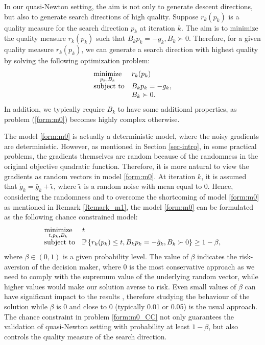 \documentclass[11pt,twoside]{article}
\begin{document}
In our quasi-Newton setting, the aim is not only to generate descent
directions, but also to generate search directions of high
quality. Suppose $r_k(p_k)$ is a quality measure for the search
direction $p_k$ at iteration $k$.  The aim is to minimize the quality
measure $r_k(p_k)$ such that $ B_k p_k = -g_k, B_k \succ 0$.
Therefore, for a given quality measure $r_k(p_k)$, we can generate a
search direction with highest quality by solving the following
optimization problem:
\begin{equation} \label{form:m0}
\begin{array}{ll}
\minimize{p_k, B_k} & { r_k(p_k)  }\\
 \subject & B_k p_k = -g_k, \\
 & B_k \succ 0.
\end{array}
\end{equation}
In addition, we typically require $B_k$ to have some additional
properties, as problem (\ref{form:m0}) becomes highly complex
otherwise.

The model \eqref{form:m0} is actually a deterministic model, where the
noisy gradients are deterministic.
However, as mentioned in Section \ref{sec-intro}, in some practical problems, the
gradients themselves are random because of the randomness in
the original objective quadratic function.  Therefore, it is more
natural to view the gradients as random vectors in model
\eqref{form:m0}.
At iteration $k$, it is assumed that $\tilde{g}_k = \bar{g}_k +
\tilde{\epsilon}$, where $\tilde{\epsilon}$ is a random noise with mean equal to $0$.
Hence, considering the randomness and to overcome the
shortcoming of model \eqref{form:m0} as mentioned in Remark
\ref{Remark_m1}, the model \eqref{form:m0} can be formulated as the
following chance constrained model:
\begin{equation}\label{form:m0_CC} %
\begin{array}{lll}
\minimize{t, p_k, B_k} & t   \\
\subject & \mathbb{P}\left\{
  r_k(p_k) \leq t, B_k p_k = -\tilde{g}_k, B_k \succ 0
\right\} \geq 1-\beta,%
\end{array}
\end{equation}
where $\beta \in (0,1)$ is a given probability level. The value of $\beta$ indicates the risk-aversion of the decision maker, where 0 is the most conservative approach as we need to comply with the supremum value of the underlying random vector, while higher values would make our solution averse to risk. Even small values of $\beta$ can have significant impact to the results \cite{Bar16}, therefore studying the behaviour of the solution while $\beta$ is 0 and close to 0 (typically 0.01 or 0.05) is the usual approach. The chance
constraint in problem \eqref{form:m0_CC} not only guarantees the
validation of quasi-Newton setting with probability at least
$1-\beta$, but also controls the quality measure of the search direction.
\end{document}
